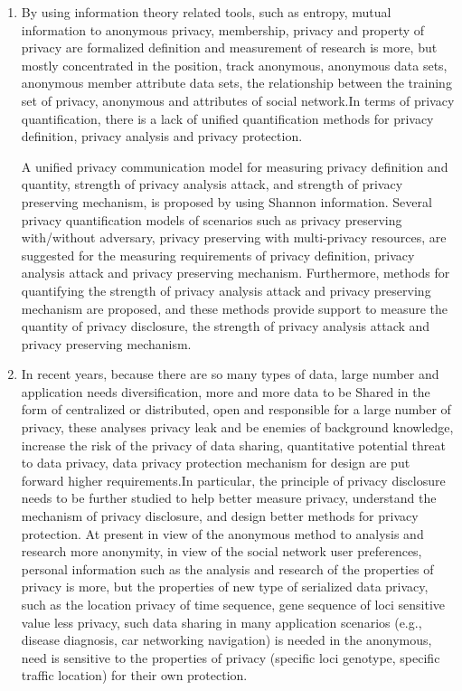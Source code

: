 \documentclass[pdftex,notypeinfo,twoside,openany,UTF8,fntef]{CASthesis}
\theoremstyle{THrm}{
	\newtheorem{question}{Question}[section]
	\newtheorem{property}{性质}[section]
	\newtheorem{assumption}{假设}[section]
	\newtheorem{claim}[lemma]{断言}
	
}
\begin{document}
\begin{enumerate}
	\item 
	By using information theory related tools, such as entropy, mutual information to anonymous privacy, membership, privacy and property of privacy are formalized definition and measurement of research is more, but mostly concentrated in the position, track anonymous, anonymous data sets, anonymous member attribute data sets, the relationship between the training set of privacy, anonymous and attributes of social network.In terms of privacy quantification, there is a lack of unified quantification methods for privacy definition, privacy analysis and privacy protection.
		
	A unified privacy communication model for measuring privacy definition and quantity, strength of privacy analysis attack, and strength of privacy preserving mechanism, is proposed by using Shannon information. 
	Several privacy quantification models of scenarios such as privacy preserving with/without adversary, privacy preserving with multi-privacy resources, are suggested for the measuring requirements of privacy definition, privacy analysis attack and privacy preserving mechanism. Furthermore, methods for quantifying the strength of  privacy analysis attack and privacy preserving mechanism are proposed, and these methods provide support to measure the quantity of privacy disclosure, the strength of  privacy analysis attack and privacy preserving mechanism.%
	
	\item 
	In recent years, because there are so many types of data, large number and application needs diversification, more and more data to be Shared in the form of centralized or distributed, open and responsible for a large number of privacy, these analyses privacy leak and be enemies of background knowledge, increase the risk of the privacy of data sharing, quantitative potential threat to data privacy, data privacy protection mechanism for design are put forward higher requirements.In particular, the principle of privacy disclosure needs to be further studied to help better measure privacy, understand the mechanism of privacy disclosure, and design better methods for privacy protection. At present in view of the anonymous method to analysis and research more anonymity, in view of the social network user preferences, personal information such as the analysis and research of the properties of privacy is more, but the properties of new type of serialized data privacy, such as the location privacy of time sequence, gene sequence of loci sensitive value less privacy, such data sharing in many application scenarios (e.g., disease diagnosis, car networking navigation) is needed in the anonymous, need is sensitive to the properties of privacy (specific loci genotype, specific traffic location) for their own protection.
		

\end{enumerate}
\end{document}
